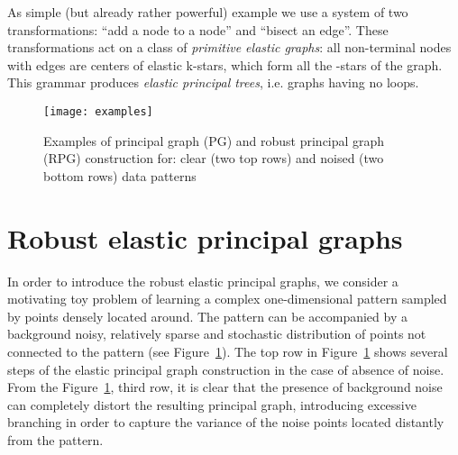 \documentclass[graybox]{archivesofdatascience}
\begin{document}
\iffalse
The selection of an
energetically optimal application of transformations by the trial
optimization steps is time-consuming. There exist alternative
approaches. The preselection of applications for a production rule
 can be done through comparison of energy of copies of 
with its incident edges and stars in the transformed graph .
\fi

As simple (but already rather powerful) example  we use a system
of two transformations: ``add a node to a node'' and ``bisect an
edge''. These transformations act on a class of {\it primitive
elastic graphs}:  all non-terminal nodes with  edges are centers
of elastic k-stars, which form all the -stars of the graph. This grammar
produces {\it elastic principal trees}, i.e. graphs having no loops.

\begin{figure}[tbp]
\texttt{[image: examples]}
\caption{Examples of principal graph (PG) and robust principal graph (RPG) construction for: clear (two top rows) and noised (two bottom rows) data patterns}
\label{GORBANEXAMPLE}       \end{figure}

\iffalse

The transformation {\it ``add a node to a node''} can be applied to any vertex
 of :  add a new node  and a new edge . The
transformation {\it ``bisect an edge''} is applicable to any pair of
graph vertices  connected by an edge : Delete edge
, add a vertex  and two edges,  and . The
transformation of elastic structure (change in the star list) is
induced by the change of topology, because the elastic graph is
primitive. This two--transformation grammar with energy minimization
builds {\it principal trees} (and principal curves, as a particular
case) for datasets.

\fi



\section{Robust elastic principal graphs}\label{robustPGs}


In order to introduce the robust elastic principal graphs, we consider a motivating toy problem of learning a complex one-dimensional pattern sampled by
points densely located around. The pattern can be accompanied by a background noisy, relatively sparse and stochastic distribution of points not connected to the pattern
(see Figure~\ref{GORBANEXAMPLE}). The top row in Figure~\ref{GORBANEXAMPLE} shows several steps of the elastic principal graph construction in the case
of absence of noise.  From the Figure~\ref{GORBANEXAMPLE}, third row, it is clear that the presence of background noise can completely distort the
resulting principal graph, introducing excessive branching in order to capture the variance of the noise points located distantly from the pattern.
\end{document}
